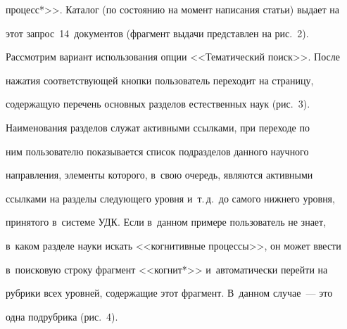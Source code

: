 процесс*>>. Каталог (по состоянию на момент написания статьи) выдает на 

этот запрос~14~документов (фрагмент выдачи представлен на рис.~2). 

Рассмотрим вариант использования опции <<Тематический поиск>>. После 

нажатия соответствующей кнопки пользователь переходит на страницу, 

содержащую перечень основных разделов естественных наук (рис.~3). 

Наименования разделов служат активными ссылками, при переходе по 

ним пользователю показывается список подразделов данного научного 

направления, элементы которого, в~свою очередь, являются активными 

ссылками на разделы следующего уровня и~т.\,д.\ до самого нижнего уровня, 

принятого в~системе УДК. Если в~данном примере пользователь не знает, 

в~каком разделе науки искать <<когнитивные процессы>>, он может ввести 

в~поисковую строку фрагмент <<когнит*>> и~автоматически перейти на 

рубрики всех уровней, содержащие этот фрагмент. В~данном случае~--- это 

одна подрубрика (рис.~4).

